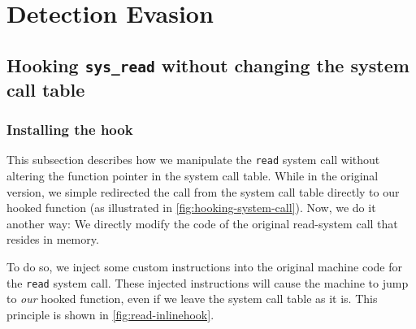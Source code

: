 \documentclass[10pt, letterpaper]{article}
\begin{document}
\section{Detection Evasion}
\label{sec:detection-evasion}

\subsection{Hooking \texttt{sys\_read} without changing the system call table}
\label{sec:hooking-read-2}

\subsubsection{Installing the hook}
\label{sec:hooking-read-install-hook}

This subsection describes how we manipulate the \texttt{read} system call without altering the function pointer in the system call table. While in the original version, we simple redirected the call from the system call table directly to our hooked function (as illustrated in \autoref{fig:hooking-system-call}). Now, we do it another way: We directly modify the code of the original read-system call that resides in memory.

To do so, we inject some custom instructions into the original machine code for the \texttt{read} system call. These injected instructions will cause the machine to jump to \emph{our} hooked function, even if we leave the system call table as it is. This principle is shown in \autoref{fig:read-inlinehook}.
\end{document}
